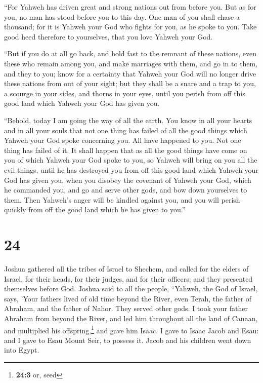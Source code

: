  ``For Yahweh has driven great and strong nations out from
before you. But as for you, no man has stood before you to this day.
 One man of you shall chase a thousand; for it is Yahweh
your God who fights for you, as he spoke to you.  Take
good heed therefore to yourselves, that you love Yahweh your God.

 ``But if you do at all go back, and hold fast to the
remnant of these nations, even these who remain among you, and make
marriages with them, and go in to them, and they to you; 
know for a certainty that Yahweh your God will no longer drive these
nations from out of your sight; but they shall be a snare and a trap to
you, a scourge in your sides, and thorns in your eyes, until you perish
from off this good land which Yahweh your God has given you.

 ``Behold, today I am going the way of all the earth. You
know in all your hearts and in all your souls that not one thing has
failed of all the good things which Yahweh your God spoke concerning
you. All have happened to you. Not one thing has failed of it.
 It shall happen that as all the good things have come on
you of which Yahweh your God spoke to you, so Yahweh will bring on you
all the evil things, until he has destroyed you from off this good land
which Yahweh your God has given you,  when you disobey
the covenant of Yahweh your God, which he commanded you, and go and
serve other gods, and bow down yourselves to them. Then Yahweh's anger
will be kindled against you, and you will perish quickly from off the
good land which he has given to you.''

\hypertarget{section-23}{%
\section{24}\label{section-23}}

 Joshua gathered all the tribes of Israel to Shechem, and
called for the elders of Israel, for their heads, for their judges, and
for their officers; and they presented themselves before God.
 Joshua said to all the people, ``Yahweh, the God of
Israel, says, 'Your fathers lived of old time beyond the River, even
Terah, the father of Abraham, and the father of Nahor. They served other
gods.  I took your father Abraham from beyond the River,
and led him throughout all the land of Canaan, and multiplied his
offspring,\footnote{\textbf{24:3} or, seed} and gave him Isaac.
 I gave to Isaac Jacob and Esau: and I gave to Esau Mount
Seir, to possess it. Jacob and his children went down into Egypt.

